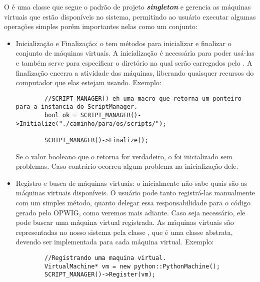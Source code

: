   O \SMgr{} é uma classe que segue o padrão de projeto
  \textbf{\textit{singleton}}\footnotemark{} e gerencia as máquinas virtuais que
  estão disponíveis no sistema, permitindo ao usuário executar algumas operações
  simples porém importantes nelas como um conjunto:

  
  \begin{itemize}
    \item Inicialização e Finalização: o \SMgr{} tem métodos para inicializar e finalizar o conjunto
      de máquinas virtuais. A inicialização é necessária para poder usá-las e também serve para
      especificar o diretório na qual  serão carregados pelo \SMgr{}. A finalização 
      encerra a atividade das máquinas, liberando quaisquer recursos do computador que elas
      estejam usando. Exemplo:
      \begin{lstlisting}
        //SCRIPT_MANAGER() eh uma macro que retorna um ponteiro para a instancia do ScriptManager.
        bool ok = SCRIPT_MANAGER()->Initialize("./caminho/para/os/scripts/");
        
        SCRIPT_MANAGER()->Finalize();
      \end{lstlisting}
      Se o valor booleano que o  retorna for verdadeiro, o \SMgr{} foi inicializado
      sem problemas. Caso contrário ocorreu algum problema na inicialização dele.
    \item Registro e busca de máquinas virtuais: o \SMgr{} inicialmente não sabe quais são as máquinas
      virtuais disponíveis. O usuário pode tanto registrá-las manualmente com um simples método, quanto
      delegar essa responsabilidade para o código gerado pelo OPWIG, como veremos mais adiante.
      Caso seja necessário, ele pode buscar uma máquina virtual registrada. As máquinas virtuais
      são representadas no nosso sistema pela classe \VMac{}, que é uma classe abstrata,
      devendo ser implementada para cada máquina virtual. Exemplo:
      \begin{lstlisting}
        //Registrando uma maquina virtual.
        VirtualMachine* vm = new python::PythonMachine();
        SCRIPT_MANAGER()->Register(vm);
        

\end{lstlisting}
\end{itemize}
